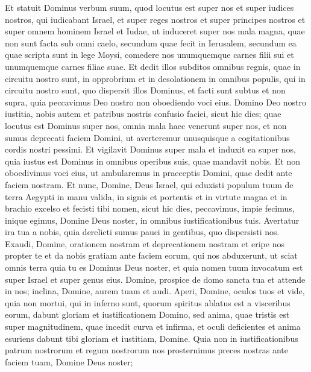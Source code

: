 \begin{biblechapter}  
\verse Et statuit Dominus verbum suum, quod locutus est super nos et super iudices nostros, qui iudicabant Israel, et super reges nostros et super principes nostros et super omnem hominem Israel et Iudae, 
\verse ut induceret super nos mala magna, quae non sunt facta sub omni caelo, secundum quae fecit in Ierusalem, secundum ea quae scripta sunt in lege Moysi, 
\verse comedere nos unumquemque carnes filii sui et unumquemque carnes filiae suae. 
\verse Et dedit illos subditos omnibus regnis, quae in circuitu nostro sunt, in opprobrium et in desolationem in omnibus populis, qui in circuitu nostro sunt, quo dispersit illos Dominus, 
\verse et facti sunt subtus et non supra, quia peccavimus Deo nostro non oboediendo voci eius. 
\verse Domino Deo nostro iustitia, nobis autem et patribus nostris confusio faciei, sicut hic dies; 
\verse quae locutus est Dominus super nos, omnia mala haec venerunt super nos, 
\verse et non sumus deprecati faciem Domini, ut averteremur unusquisque a cogitationibus cordis nostri pessimi. 
\verse Et vigilavit Dominus super mala et induxit ea super nos, quia iustus est Dominus in omnibus operibus suis, quae mandavit nobis. 
\verse Et non oboedivimus voci eius, ut ambularemus in praeceptis Domini, quae dedit ante faciem nostram. 
\verse Et nunc, Domine, Deus Israel, qui eduxisti populum tuum de terra Aegypti in manu valida, in signis et portentis et in virtute magna et in brachio excelso et fecisti tibi nomen, sicut hic dies, 
\verse peccavimus, impie fecimus, inique egimus, Domine Deus noster, in omnibus iustificationibus tuis. 
\verse Avertatur ira tua a nobis, quia derelicti sumus pauci in gentibus, quo dispersisti nos.  
\verse Exaudi, Domine, orationem nostram et deprecationem nostram et eripe nos propter te et da nobis gratiam ante faciem eorum, qui nos abduxerunt, 
\verse ut sciat omnis terra quia tu es Dominus Deus noster, et quia nomen tuum invocatum est super Israel et super genus eius. 
\verse Domine, prospice de domo sancta tua et attende in nos; inclina, Domine, aurem tuam et audi. 
\verse Aperi, Domine, oculos tuos et vide, quia non mortui, qui in inferno sunt, quorum spiritus ablatus est a visceribus eorum, dabunt gloriam et iustificationem Domino, 
\verse sed anima, quae tristis est super magnitudinem, quae incedit curva et infirma, et oculi deficientes et anima esuriens dabunt tibi gloriam et iustitiam, Domine.  
\verse Quia non in iustificationibus patrum nostrorum et regum nostrorum nos prosternimus preces nostras ante faciem tuam, Domine Deus noster; 

\end{biblechapter}
